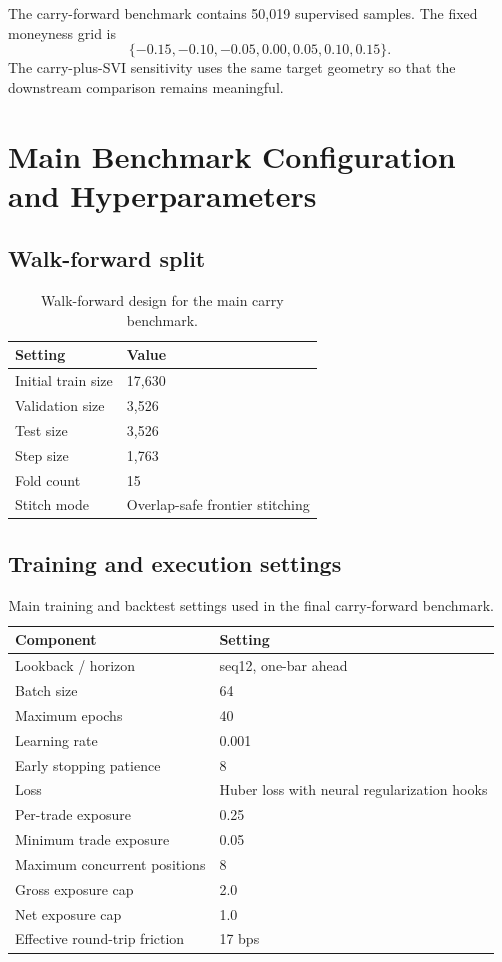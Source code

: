 \documentclass[12pt]{report}
\begin{document}
The carry-forward benchmark contains 50,019 supervised samples. The fixed moneyness grid is
\[
\{-0.15,-0.10,-0.05,0.00,0.05,0.10,0.15\}.
\]
The carry-plus-SVI sensitivity uses the same target geometry so that the downstream comparison remains meaningful.

\chapter{Main Benchmark Configuration and Hyperparameters}

\section{Walk-forward split}
\begin{table}[H]
\centering
\caption{Walk-forward design for the main carry benchmark.}
\footnotesize
\renewcommand{\arraystretch}{1.15}
\begin{tabularx}{\textwidth}{@{}lY@{}}
\toprule
\textbf{Setting} & \textbf{Value} \\
\midrule
Initial train size & 17,630 \\
Validation size & 3,526 \\
Test size & 3,526 \\
Step size & 1,763 \\
Fold count & 15 \\
Stitch mode & Overlap-safe frontier stitching \\
\bottomrule
\end{tabularx}
\end{table}

\section{Training and execution settings}
\begin{table}[H]
\centering
\caption{Main training and backtest settings used in the final carry-forward benchmark.}
\footnotesize
\renewcommand{\arraystretch}{1.15}
\begin{tabularx}{\textwidth}{@{}lY@{}}
\toprule
\textbf{Component} & \textbf{Setting} \\
\midrule
Lookback / horizon & seq12, one-bar ahead \\
Batch size & 64 \\
Maximum epochs & 40 \\
Learning rate & 0.001 \\
Early stopping patience & 8 \\
Loss & Huber loss with neural regularization hooks \\
Per-trade exposure & 0.25 \\
Minimum trade exposure & 0.05 \\
Maximum concurrent positions & 8 \\
Gross exposure cap & 2.0 \\
Net exposure cap & 1.0 \\
Effective round-trip friction & 17 bps \\
\bottomrule
\end{tabularx}
\end{table}
\end{document}
